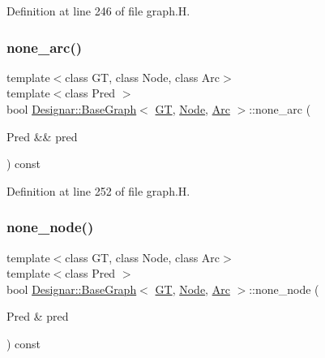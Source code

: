 Definition at line 246 of file graph.\+H.

\mbox{\label{class_designar_1_1_base_graph_a69c4841b8c517a510d738bc1204da7b7}} 
\subsubsection{\texorpdfstring{none\+\_\+arc()}{none\_arc()}\hspace{0.1cm}{\footnotesize\ttfamily [2/2]}}
{\footnotesize\ttfamily template$<$class GT, class Node, class Arc$>$ \\
template$<$class Pred $>$ \\
bool \hyperlink{class_designar_1_1_base_graph}{Designar\+::\+Base\+Graph}$<$ \hyperlink{demo-buildgraph_8_c_a3001c40d2c31ca87ed96cd7d1334a55e}{GT}, \hyperlink{namespace_designar_a5af326c65aa2bd26b26c410f2030d09e}{Node}, \hyperlink{namespace_designar_a3f55fb5513d62ff47cbc8f72b8e95d6f}{Arc} $>$\+::none\+\_\+arc (\begin{DoxyParamCaption}\item[{Pred \&\&}]{pred }\end{DoxyParamCaption}) const\hspace{0.3cm}{\ttfamily [inline]}}



Definition at line 252 of file graph.\+H.

\mbox{\label{class_designar_1_1_base_graph_aa87c903e7fbf82a30edc9e442a115050}} 
\subsubsection{\texorpdfstring{none\+\_\+node()}{none\_node()}\hspace{0.1cm}{\footnotesize\ttfamily [1/2]}}
{\footnotesize\ttfamily template$<$class GT, class Node, class Arc$>$ \\
template$<$class Pred $>$ \\
bool \hyperlink{class_designar_1_1_base_graph}{Designar\+::\+Base\+Graph}$<$ \hyperlink{demo-buildgraph_8_c_a3001c40d2c31ca87ed96cd7d1334a55e}{GT}, \hyperlink{namespace_designar_a5af326c65aa2bd26b26c410f2030d09e}{Node}, \hyperlink{namespace_designar_a3f55fb5513d62ff47cbc8f72b8e95d6f}{Arc} $>$\+::none\+\_\+node (\begin{DoxyParamCaption}\item[{Pred \&}]{pred }\end{DoxyParamCaption}) const\hspace{0.3cm}{\ttfamily [inline]}}



